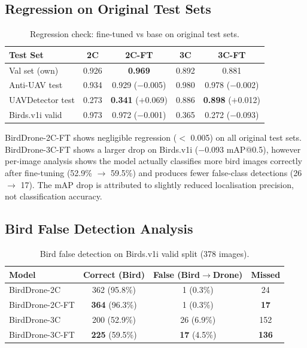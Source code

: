 \documentclass[11pt]{article}
\begin{document}
\subsection{Regression on Original Test Sets}

\begin{table}[H]
\centering
\caption{Regression check: fine-tuned vs base on original test sets.}
\label{tab:regression}
\begin{tabular}{lcccc}
\toprule
\textbf{Test Set} & \textbf{2C} & \textbf{2C-FT} & \textbf{3C} & \textbf{3C-FT} \\
\midrule
Val set (own)         & 0.926 & \textbf{0.969} & 0.892 & 0.881 \\
Anti-UAV test         & 0.934 & 0.929 ($-$0.005) & 0.980 & 0.978 ($-$0.002) \\
UAVDetector test      & 0.273 & \textbf{0.341} ($+$0.069) & 0.886 & \textbf{0.898} ($+$0.012) \\
Birds.v1i valid       & 0.973 & 0.972 ($-$0.001) & 0.365 & 0.272 ($-$0.093) \\
\bottomrule
\end{tabular}
\end{table}

BirdDrone-2C-FT shows negligible regression ($<$ 0.005) on all original
test sets. BirdDrone-3C-FT shows a larger drop on Birds.v1i ($-$0.093
mAP@0.5), however per-image analysis shows the model actually classifies
more bird images correctly after fine-tuning (52.9\% $\to$ 59.5\%) and
produces fewer false-class detections (26 $\to$ 17). The mAP drop is
attributed to slightly reduced localisation precision, not classification
accuracy.

\subsection{Bird False Detection Analysis}

\begin{table}[H]
\centering
\caption{Bird false detection on Birds.v1i valid split (378 images).}
\label{tab:bird_fp}
\begin{tabular}{lccc}
\toprule
\textbf{Model} & \textbf{Correct (Bird)} & \textbf{False (Bird$\to$Drone)} & \textbf{Missed} \\
\midrule
BirdDrone-2C    & 362 (95.8\%) & 1 (0.3\%)  & 24 \\
BirdDrone-2C-FT & \textbf{364} (96.3\%) & 1 (0.3\%) & \textbf{17} \\
BirdDrone-3C    & 200 (52.9\%) & 26 (6.9\%) & 152 \\
BirdDrone-3C-FT & \textbf{225} (59.5\%) & \textbf{17} (4.5\%) & \textbf{136} \\
\bottomrule
\end{tabular}
\end{table}
\end{document}
